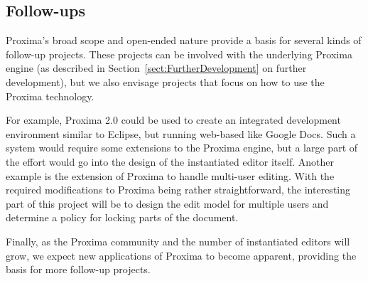 \documentclass[10pt]{article}
\begin{document}
\subsection{Follow-ups}
%
% 
Proxima's broad scope and open-ended nature provide a basis for several kinds of follow-up projects. These projects can be involved with the underlying Proxima engine (as described in Section~\ref{sect:FurtherDevelopment} on further development), but we also envisage projects that focus on how to use the Proxima technology.

For example, Proxima 2.0 could be used to create an integrated development environment similar to Eclipse, but running web-based like Google Docs. Such a system would require some extensions to the Proxima engine, but a large part of the effort would go into the design of the instantiated editor itself. Another example is the extension of Proxima to handle multi-user editing. With the required modifications to Proxima being rather straightforward, the interesting part of this project will be to design the edit model for multiple users and determine a policy for locking parts of the document.

Finally, as the Proxima community and the number of instantiated editors will grow, we expect new applications of Proxima to become apparent, providing the basis for more follow-up projects.
\end{document}
